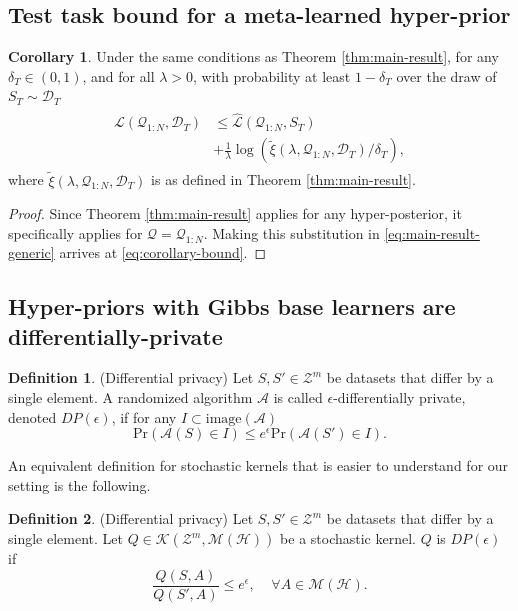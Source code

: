 \documentclass[letterpaper]{article} %
\theoremstyle{definition}
\newtheorem{defn}{Definition}[section]
\newtheorem{corollary}[theorem]{Corollary}
\begin{document}
\subsection{Test task bound for a meta-learned hyper-prior} \label{append:corollary-bound}
\begin{corollary} \label{thm:corollary-base}
	Under the same conditions as Theorem \ref{thm:main-result},
	for any $\delta_T \in (0,1)$, and for all $\lambda>0$, with probability at least $1-\delta_T$ over the draw of $S_T\sim \mathcal{D}_T$
%	
    \begin{align} \label{eq:corollary-bound}
    \begin{split}
    \mathcal{L}(\mathcal{Q}_{1:N}, \mathcal{D}_T) &\leq \hat{\mathcal{L}}(\mathcal{Q}_{1:N}, S_T)\\
	&+\frac{1}{\lambda}\log\left (\tilde{\xi}(\lambda,\mathcal{Q}_{1:N},\mathcal{D}_T)/\delta_T\right ) ,
    \end{split}
    \end{align}
	where $\tilde{\xi}(\lambda,\mathcal{Q}_{1:N},\mathcal{D}_T)$ is as defined in  Theorem \ref{thm:main-result}.
\end{corollary}
%
\begin{proof}
    Since Theorem \ref{thm:main-result} applies for any hyper-posterior, it specifically applies for $\mathcal{Q}=\mathcal{Q}_{1:N}$.
    Making this substitution in \eqref{eq:main-result-generic} arrives at \eqref{eq:corollary-bound}.
\end{proof}

\subsection{Hyper-priors with Gibbs base learners are differentially-private} \label{append:proof-dp}

\begin{defn} (Differential privacy) \citep{Dwork2006}
	Let $S,S'\in \mathcal{Z}^m$ be datasets that differ by a single element.
	A randomized algorithm $\mathcal{A}$ is called  $\epsilon$-differentially private, denoted $DP(\epsilon)$, if for any $I\subset \mathrm{image}(\mathcal{A})$
%	
	$$
	\mathrm{Pr}(\mathcal{A}(S)\in I)\leq e^\epsilon \mathrm{Pr}(\mathcal{A}(S')\in I) .
	$$
\end{defn}\label{def:diff_privacy}

An equivalent definition for stochastic kernels that is easier to understand for our setting is the following. 
%
\begin{defn} (Differential privacy)
	Let $S,S'\in \mathcal{Z}^m$ be datasets that differ by a single element.
	Let $Q\in \mathcal{K}(\mathcal{Z}^m, \mathcal{M}(\mathcal{H}))$ be a stochastic kernel.
	$Q$ is $DP(\epsilon)$ if 
%	
	$$\frac{Q(S, A)}{Q(S', A)} \leq e^\epsilon, \;\;\;\; \forall A\in  \mathcal{M}(\mathcal{H}) .$$
\end{defn}
\end{document}
